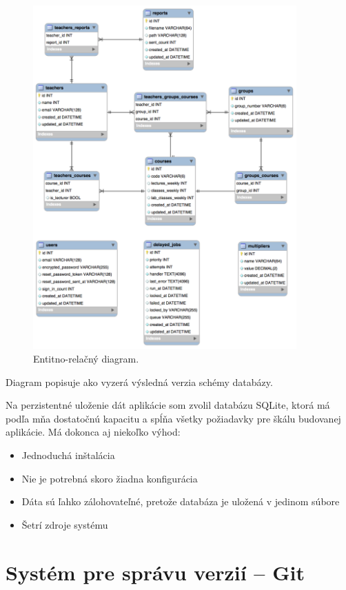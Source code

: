 \begin{figure}[!htb]
  \centering
  \hspace*{-0.5cm}
  \includegraphics[width=0.9\textwidth]{content/images/db}
  \caption{Entitno-relačný diagram.}
\end{figure}

\clearpage
Diagram popisuje ako vyzerá výsledná verzia schémy databázy.

Na perzistentné uloženie dát aplikácie som zvolil databázu SQLite, ktorá má podľa mňa dostatočnú kapacitu a spĺňa všetky požiadavky pre škálu budovanej aplikácie. Má dokonca aj niekoľko výhod:

\begin{itemize}
    \item Jednoduchá inštalácia
    \item Nie je potrebná skoro žiadna konfigurácia
    \item Dáta sú ľahko zálohovateľné, pretože databáza je uložená v jedinom súbore
    \item Šetrí zdroje systému
\end{itemize}

\section{Systém pre správu verzií -- Git}

